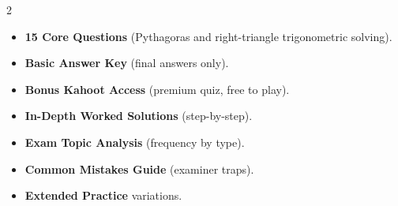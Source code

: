 \documentclass[11pt,a4paper]{article}
\newcommand{\FullReleaseDate}{April 30, 2026}
\begin{document}
\vspace{8pt}

\begin{multicols}{2}
  \begin{tcolorbox}[card, title=\sffamily\bfseries\textcolor{white}{\faHandPointDown\ TODAY (Simplified Version)}, colbacktitle=mainblue, boxed title style={sharp corners, boxrule=0pt}]
    \begin{itemize}[leftmargin=1.2em, itemsep=2pt]
      \item \small \textbf{15 Core Questions} (Pythagoras and right-triangle trigonometric solving).
      \item \small \textbf{Basic Answer Key} (final answers only).
      \item \small \textbf{Bonus Kahoot Access} (premium quiz, free to play).
    \end{itemize}
  \end{tcolorbox}

  \columnbreak

  \begin{tcolorbox}[card, title=\sffamily\bfseries\textcolor{white}{\faRocket\ ON \FullReleaseDate\ (Full Upgrade)}, colbacktitle=mainblue, boxed title style={sharp corners, boxrule=0pt}]
    \begin{itemize}[leftmargin=1.2em, itemsep=2pt]
      \item \small \textbf{In-Depth Worked Solutions} (step-by-step).
      \item \small \textbf{Exam Topic Analysis} (frequency by type).
      \item \small \textbf{Common Mistakes Guide} (examiner traps).
      \item \small \textbf{Extended Practice} variations.
    \end{itemize}
  \end{tcolorbox}
\end{multicols}
\end{document}
